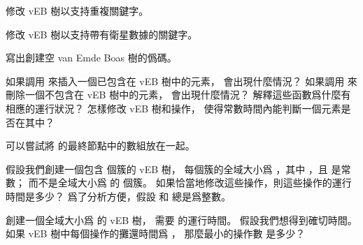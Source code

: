 \startsection[
  title={The van Emde Boas tree},
]

\startEXERCISE
修改 vEB 樹以支持重複關鍵字。
\stopEXERCISE

\startANSWER
{}
\stopANSWER

\startEXERCISE
修改 vEB 樹以支持帶有衛星數據的關鍵字。
\stopEXERCISE

\startANSWER
{}
\stopANSWER

\startEXERCISE
寫出創建空 van Emde Boas 樹的僞碼。
\stopEXERCISE

\startANSWER
{}
\stopANSWER

\startEXERCISE
如果調用  來插入一個已包含在 vEB 樹中的元素，
會出現什麼情況？
如果調用  來刪除一個不包含在 vEB 樹中的元素，
會出現什麼情況？
解釋這些函數爲什麼有相應的運行狀況？
怎樣修改 vEB 樹和操作，
使得常數時間內能判斷一個元素是否在其中？
\stopEXERCISE

\startANSWER
可以嘗試將  的最終節點中的數組放在一起。
\stopANSWER

\startEXERCISE
假設我們創建一個包含  個簇的 vEB 樹，
每個簇的全域大小爲 ，其中 ，且  是常數；
而不是全域大小爲  的  個簇。
如果恰當地修改這些操作，則這些操作的運行時間是多少？
爲了分析方便，假設  和  總是爲整數。
\stopEXERCISE

\startANSWER
{}
\stopANSWER

\startEXERCISE
創建一個全域大小爲  的 vEB 樹，
需要  的運行時間。
假設我們想得到確切時間。
如果 vEB 樹中每個操作的攤還時間爲 ，
那麼最小的操作數  是多少？
\stopEXERCISE

\startANSWER
{}
\stopANSWER

\stopsection
